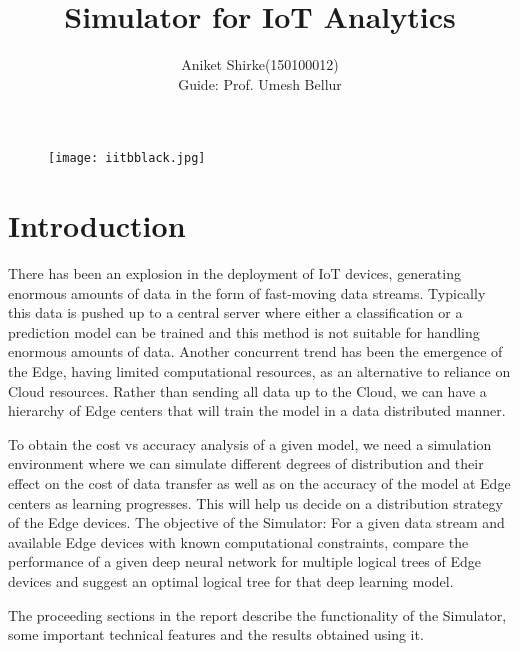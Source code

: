 \documentclass[a4paper, 12pt]{article}
\begin{document}
\author{Aniket Shirke(150100012) \\Guide: Prof. Umesh Bellur}
\title{\textbf{ Simulator for IoT Analytics }}

\maketitle
\begin{figure}[ht]
    \begin{center}
        \texttt{[image: iitbblack.jpg]}
    \end{center}
\end{figure}
 
\begin{abstract}

\end{abstract}

\newpage
\tableofcontents
\newpage

\section{Introduction}

There has been an explosion in the deployment of IoT devices, generating enormous amounts of data in the form of fast-moving data streams. Typically this data is pushed up to a central server where either a classification or a prediction model can be trained and this method is not suitable for handling enormous amounts of data. Another concurrent trend has been the emergence of the Edge, having limited computational resources, as an alternative to reliance on Cloud resources. Rather than sending all data up to the Cloud, we can have a hierarchy of Edge centers that will train the model in a data distributed manner.

To obtain the cost vs accuracy analysis of a given model, we need a simulation environment where we can simulate different degrees of distribution and their effect on the cost of data transfer as well as on the accuracy of the model at Edge centers as learning progresses.  This will help us decide on a distribution strategy of the Edge devices. The objective of the Simulator: For a given data stream and available Edge devices with known computational constraints, compare the performance of a given deep neural network for multiple logical trees of Edge devices and suggest an optimal logical tree for that deep learning model.

The proceeding sections in the report describe the functionality of the Simulator, some important technical features and the results obtained using it.
\end{document}
